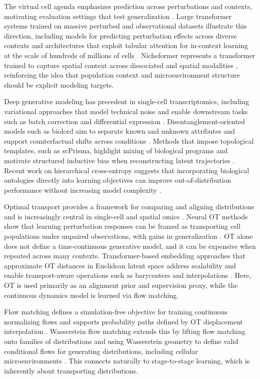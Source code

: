 \documentclass[conference]{IEEEtran}
\begin{document}
The virtual cell agenda emphasizes prediction across perturbations and contexts, motivating evaluation settings that test generalization \cite{Roohani2025-yb}. Large transformer systems trained on massive perturbed and observational datasets illustrate this direction, including models for predicting perturbation effects across diverse contexts \cite{Adduri2025-nt} and architectures that exploit tabular attention for in-context learning at the scale of hundreds of millions of cells \cite{Dong2026-fb}. Nicheformer represents a transformer trained to capture spatial context across dissociated and spatial modalities \cite{Tejada-Lapuerta2025-wz}, reinforcing the idea that population context and microenvironment structure should be explicit modeling targets.

Deep generative modeling has precedent in single-cell transcriptomics, including variational approaches that model technical noise and enable downstream tasks such as batch correction and differential expression \cite{Lopez2018-ns}. Disentanglement-oriented models such as biolord aim to separate known and unknown attributes and support counterfactual shifts across conditions \cite{Piran2024-ca}. Methods that impose topological templates, such as scPrisma, highlight mixing of biological programs and motivate structured inductive bias when reconstructing latent trajectories \cite{Karin2023-sa}. Recent work on hierarchical cross-entropy suggests that incorporating biological ontologies directly into learning objectives can improve out-of-distribution performance without increasing model complexity \cite{Cultrera-di-Montesano2026-vq}.

Optimal transport provides a framework for comparing and aligning distributions and is increasingly central in single-cell and spatial omics \cite{Bunne2024-pl}. Neural OT methods show that learning perturbation responses can be framed as transporting cell populations under unpaired observations, with gains in generalization \cite{Bunne2023-bm}. OT alone does not define a time-continuous generative model, and it can be expensive when repeated across many contexts. Transformer-based embedding approaches that approximate OT distances in Euclidean latent space address scalability and enable transport-aware operations such as barycenters and interpolations \cite{Haviv2024-uz}. Here, OT is used primarily as an alignment prior and supervision proxy, while the continuous dynamics model is learned via flow matching.

Flow matching defines a simulation-free objective for training continuous normalizing flows and supports probability paths defined by OT displacement interpolation \cite{Lipman2022-ns}. Wasserstein flow matching extends this by lifting flow matching onto families of distributions and using Wasserstein geometry to define valid conditional flows for generating distributions, including cellular microenvironments \cite{Haviv2024-qe}. This connects naturally to stage-to-stage learning, which is inherently about transporting distributions.
\end{document}
